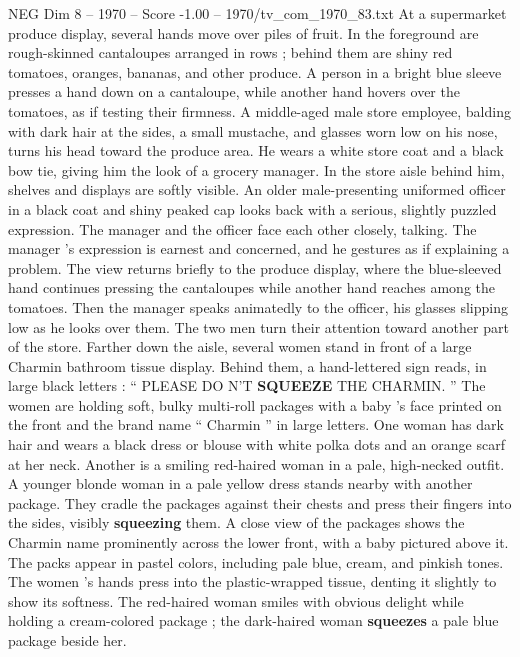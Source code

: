 \begin{textsample}{NEG Dim 8 – 1970 – Score -1.00 – 1970/tv\_com\_1970\_83.txt}  \label{ex:f8_neg_069}
At a supermarket produce display, several hands move over piles of fruit.
In the foreground are rough-skinned cantaloupes arranged in rows ; behind them are shiny red tomatoes, oranges, bananas, and other produce.
A person in a bright blue sleeve presses a hand down on a cantaloupe, while another hand hovers over the tomatoes, as if testing their firmness.
A middle-aged male store employee, balding with dark hair at the sides, a small mustache, and glasses worn low on his nose, turns his head toward the produce area.
He wears a white store coat and a black bow tie, giving him the look of a grocery manager.
In the store aisle behind him, shelves and displays are softly visible.
An older male-presenting uniformed officer in a black coat and shiny peaked cap looks back with a serious, slightly puzzled expression.
The manager and the officer face each other closely, talking.
The manager ’s expression is earnest and concerned, and he gestures as if explaining a problem.
The view returns briefly to the produce display, where the blue-sleeved hand continues pressing the cantaloupes while another hand reaches among the tomatoes.
Then the manager speaks animatedly to the officer, his glasses slipping low as he looks over them.
The two men turn their attention toward another part of the store.
Farther down the aisle, several women stand in front of a large Charmin bathroom tissue display.
Behind them, a hand-lettered sign reads, in large black letters : “ PLEASE DO N’T \textbf{SQUEEZE} THE CHARMIN. ” The women are holding soft, bulky multi-roll packages with a baby ’s face printed on the front and the brand name “ Charmin ” in large letters.
One woman has dark hair and wears a black dress or blouse with white polka dots and an orange scarf at her neck.
Another is a smiling red-haired woman in a pale, high-necked outfit.
A younger blonde woman in a pale yellow dress stands nearby with another package.
They cradle the packages against their chests and press their fingers into the sides, visibly \textbf{squeezing} them.
A close view of the packages shows the Charmin name prominently across the lower front, with a baby pictured above it.
The packs appear in pastel colors, including pale blue, cream, and pinkish tones.
The women ’s hands press into the plastic-wrapped tissue, denting it slightly to show its softness.
The red-haired woman smiles with obvious delight while holding a cream-colored package ; the dark-haired woman \textbf{squeezes} a pale blue package beside her.

\end{textsample}
